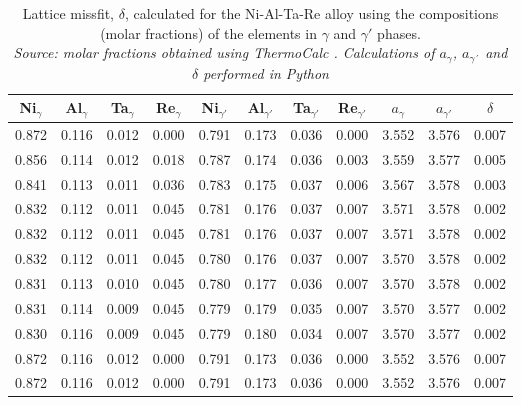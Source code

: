 \begin{table}[H]
    \centering
    \begin{tabular}{rrrrrrrrrrr}
        \multicolumn{1}{c}{Ni$_\gamma$} & \multicolumn{1}{c}{Al$_\gamma$} & \multicolumn{1}{c}{Ta$_\gamma$} & \multicolumn{1}{c}{Re$_\gamma$} & \multicolumn{1}{c}{Ni$_{\gamma'}$} & \multicolumn{1}{c}{Al$_{\gamma'}$} & \multicolumn{1}{c}{Ta$_{\gamma'}$} & \multicolumn{1}{c}{Re$_{\gamma'}$} & \multicolumn{1}{c}{$a_\gamma$} & \multicolumn{1}{c}{$a_{\gamma'}$} & \multicolumn{1}{c}{$\delta$} \\ \hline \hline
        0.872 & 0.116 & 0.012 & 0.000 & 0.791 & 0.173 & 0.036 & 0.000 & 3.552 & 3.576 & 0.007 \\0.856 & 0.114 & 0.012 & 0.018 & 0.787 & 0.174 & 0.036 & 0.003 & 3.559 & 3.577 & 0.005 \\0.841 & 0.113 & 0.011 & 0.036 & 0.783 & 0.175 & 0.037 & 0.006 & 3.567 & 3.578 & 0.003 \\0.832 & 0.112 & 0.011 & 0.045 & 0.781 & 0.176 & 0.037 & 0.007 & 3.571 & 3.578 & 0.002 \\0.832 & 0.112 & 0.011 & 0.045 & 0.781 & 0.176 & 0.037 & 0.007 & 3.571 & 3.578 & 0.002 \\0.832 & 0.112 & 0.011 & 0.045 & 0.780 & 0.176 & 0.037 & 0.007 & 3.570 & 3.578 & 0.002 \\0.831 & 0.113 & 0.010 & 0.045 & 0.780 & 0.177 & 0.036 & 0.007 & 3.570 & 3.578 & 0.002 \\0.831 & 0.114 & 0.009 & 0.045 & 0.779 & 0.179 & 0.035 & 0.007 & 3.570 & 3.577 & 0.002 \\0.830 & 0.116 & 0.009 & 0.045 & 0.779 & 0.180 & 0.034 & 0.007 & 3.570 & 3.577 & 0.002 \\0.872 & 0.116 & 0.012 & 0.000 & 0.791 & 0.173 & 0.036 & 0.000 & 3.552 & 3.576 & 0.007 \\0.872 & 0.116 & 0.012 & 0.000 & 0.791 & 0.173 & 0.036 & 0.000 & 3.552 & 3.576 & 0.007
    \end{tabular}
    \caption{\centering Lattice missfit, $\delta$, calculated for the Ni-Al-Ta-Re alloy using the compositions (molar fractions) of the elements in $\gamma$ and $\gamma'$ phases. \\
    \textit{Source: molar fractions obtained using ThermoCalc \citep{thermocalc}. Calculations of $a_\gamma$, $a_{\gamma´}$ and $\delta$ performed in Python \citep{mygit}}}
    \label{tab:tab10}
\end{table}


